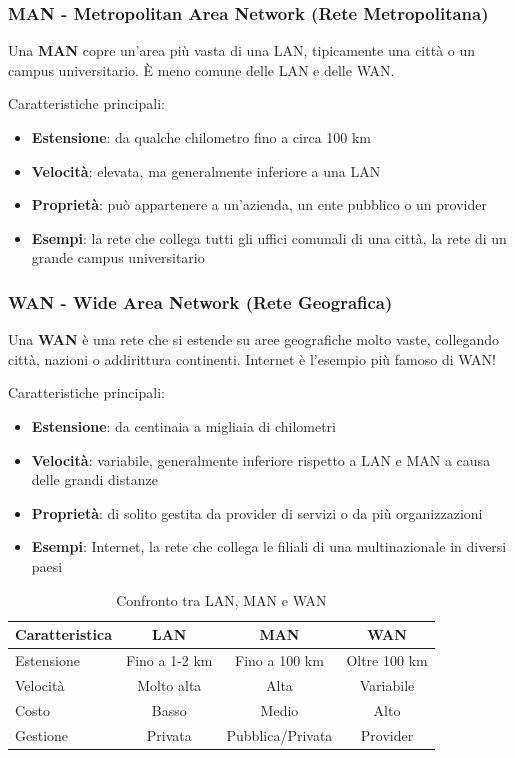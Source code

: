 \documentclass[12pt,a4paper]{article}
\begin{document}
\subsubsection*{MAN - Metropolitan Area Network (Rete Metropolitana)}

Una \textbf{MAN} copre un'area più vasta di una LAN, tipicamente una città o un campus universitario. È meno comune delle LAN e delle WAN.

Caratteristiche principali:
\begin{itemize}
    \item \textbf{Estensione}: da qualche chilometro fino a circa 100 km
    \item \textbf{Velocità}: elevata, ma generalmente inferiore a una LAN
    \item \textbf{Proprietà}: può appartenere a un'azienda, un ente pubblico o un provider
    \item \textbf{Esempi}: la rete che collega tutti gli uffici comunali di una città, la rete di un grande campus universitario
\end{itemize}

\subsubsection*{WAN - Wide Area Network (Rete Geografica)}

Una \textbf{WAN} è una rete che si estende su aree geografiche molto vaste, collegando città, nazioni o addirittura continenti. Internet è l'esempio più famoso di WAN!

Caratteristiche principali:
\begin{itemize}
    \item \textbf{Estensione}: da centinaia a migliaia di chilometri
    \item \textbf{Velocità}: variabile, generalmente inferiore rispetto a LAN e MAN a causa delle grandi distanze
    \item \textbf{Proprietà}: di solito gestita da provider di servizi o da più organizzazioni
    \item \textbf{Esempi}: Internet, la rete che collega le filiali di una multinazionale in diversi paesi
\end{itemize}

\begin{table}[h]
\centering
\begin{tabular}{|l|c|c|c|}
\hline
\textbf{Caratteristica} & \textbf{LAN} & \textbf{MAN} & \textbf{WAN} \\
\hline
Estensione & Fino a 1-2 km & Fino a 100 km & Oltre 100 km \\
Velocità & Molto alta & Alta & Variabile \\
Costo & Basso & Medio & Alto \\
Gestione & Privata & Pubblica/Privata & Provider \\
\hline
\end{tabular}
\caption{Confronto tra LAN, MAN e WAN}
\end{table}
\end{document}
